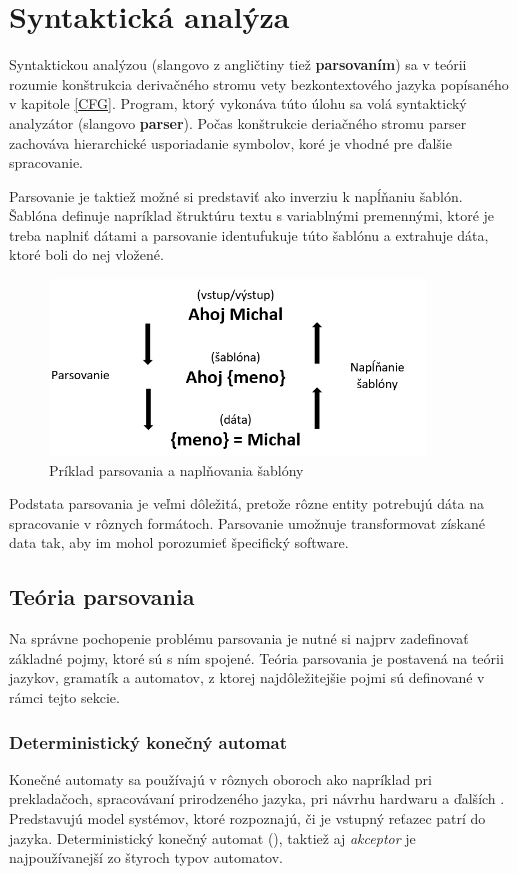 \chapter{Syntaktická analýza}
Syntaktickou analýzou (slangovo z angličtiny tiež \textbf{parsovaním}) sa v teórii rozumie konštrukcia derivačného stromu vety bezkontextového jazyka\cite{CVUT:program_language} popísaného v kapitole \ref{CFG}. Program, ktorý vykonáva túto úlohu sa volá syntaktický analyzátor (slangovo \textbf{parser}). Počas konštrukcie deriačného stromu parser zachováva hierarchické usporiadanie symbolov, koré je vhodné pre ďalšie spracovanie.

Parsovanie je taktiež možné si predstaviť ako inverziu k napĺňaniu šablón. Šablóna definuje napríklad štruktúru textu s variablnými premennými, ktoré je treba naplniť dátami a parsovanie identufukuje túto šablónu a extrahuje dáta, ktoré boli do nej vložené.

\begin{figure}[H]
\begin{center}
\includegraphics[width=10cm]{figures/templatingAndParsing.PNG}
\caption{Príklad parsovania a naplňovania šablóny}
\label{fig:templatingAndParsing}
\end{center}
\end{figure}

Podstata parsovania je veľmi dôležitá, pretože rôzne entity potrebujú dáta na spracovanie v rôznych formátoch. Parsovanie umožnuje transformovat získané data tak, aby im mohol porozumieť špecifický software. 

\section{Teória parsovania}
Na správne pochopenie problému parsovania je nutné si najprv zadefinovať základné pojmy, ktoré sú s ním spojené. Teória parsovania je postavená na teórii jazykov, gramatík a automatov, z ktorej najdôležitejšie pojmi sú definované v rámci tejto sekcie.

\subsection{Deterministický konečný automat}\label{DFA}
Konečné automaty sa používajú v rôznych oboroch ako napríklad pri prekladačoch, spracovávaní prirodzeného jazyka, pri návrhu hardwaru a ďalších \cite{demlova:automaty}. Predstavujú model systémov, ktoré rozpoznajú, či je vstupný reťazec patrí do jazyka. Deterministický konečný automat (), taktiež aj \textit{akceptor} je najpoužívanejší zo štyroch typov automatov.

